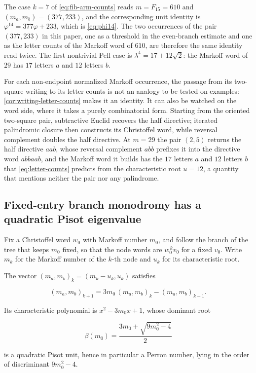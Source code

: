 \begin{remark}
\label{rem:377-233}
The case $k=7$ of \cref{eq:fib-arm-counts} reads $m=F_{15}=610$ and
$(m_a,m_b)=(377,233)$, and the corresponding unit identity is
$\varphi^{14}=377\varphi+233$, which is \cref{eq:phi14}. The two occurrences
of the pair $(377,233)$ in this paper, one as a threshold in the
even-branch estimate and one as the letter counts of the Markoff word of
$610$, are therefore the same identity read twice. The first nontrivial Pell
case is $\lambda^4=17+12\sqrt2$: the Markoff word of $29$ has $17$ letters
$a$ and $12$ letters $b$.

For each non-endpoint normalized Markoff occurrence, the passage from its
two-square writing to its letter counts is not an analogy to be tested on
examples: \cref{cor:writing-letter-counts} makes it an identity. It can also
be watched on the word side, where it takes a purely combinatorial form.
Starting from the oriented two-square pair, subtractive Euclid recovers the
half directive; iterated palindromic closure then constructs its Christoffel
word, while reversal complement doubles the half directive. At $m=29$ the
pair $(2,5)$ returns the half directive $aab$, whose reversal complement
$abb$ prefixes it into the directive word $abbaab$, and the Markoff word
it builds has the $17$ letters $a$ and $12$ letters $b$ that
\cref{eq:letter-counts} predicts from the characteristic root $u=12$, a
quantity that mentions neither the pair nor any palindrome.
\end{remark}

\subsection{Fixed-entry branch monodromy has a quadratic Pisot eigenvalue}

Fix a Christoffel word $w_0$ with Markoff number $m_0$, and follow the branch
of the tree that keeps $m_0$ fixed, so that the node words are
$w_0^{\,k}v_0$ for a fixed $v_0$. Write $m_k$ for the Markoff number of the
$k$-th node and $u_k$ for its characteristic root.

\begin{proposition}
\label{prop:branch-recurrence}
The vector $(m_a,m_b)_k=(m_k-u_k,u_k)$ satisfies

\begin{equation}
 (m_a,m_b)_{k+1}
 =3m_0\,(m_a,m_b)_k-(m_a,m_b)_{k-1}.
 \label{eq:branch-recurrence}
\end{equation}

Its characteristic polynomial is $x^2-3m_0x+1$, whose dominant root

\begin{equation}
 \beta(m_0)=\frac{3m_0+\sqrt{9m_0^2-4}}2
 \label{eq:branch-perron}
\end{equation}

 is a quadratic Pisot unit, hence in particular a Perron number, lying in the
order of discriminant $9m_0^2-4$.
\end{proposition}

